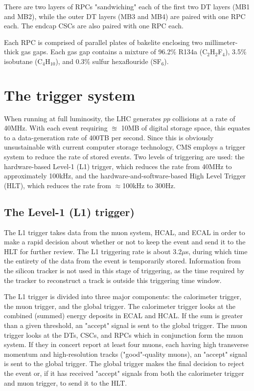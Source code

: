 There are two layers of RPCs "sandwiching" each of the first two DT layers (MB1 and MB2), while the outer DT layers (MB3 and MB4) are paired with one RPC each. The endcap CSCs are also paired with one RPC each. 

Each RPC is comprised of parallel plates of bakelite enclosing two millimeter-thick gas gaps. Each gas gap contains a mixture of 96.2\% R134a (C$_2$H$_2$F$_4$), 3.5\% isobutane (C$_4$H$_10$), and 0.3\% sulfur hexaflouride (SF$_6$).

\section{The trigger system}

When running at full luminosity, the LHC generates $pp$ collisions at a rate of 40MHz. With each event requiring $\approxeq$ 10MB of digital storage space, this equates to a data-generation rate of 400TB per second. Since this is obviously unsustainable with current computer storage technology, CMS employs a trigger system to reduce the rate of stored events. Two levels of triggering are used: the hardware-based Level-1 (L1) trigger, which reduces the rate from 40MHz to approximately 100kHz, and the hardware-and-software-based High Level Trigger (HLT), which reduces the rate from $\approx$100kHz to 300Hz.

\subsection{The Level-1 (L1) trigger)}

The L1 trigger takes data from the muon system, HCAL, and ECAL in order to make a rapid decision about whether or not to keep the event and send it to the HLT for further review. The L1 triggering rate is about 3.2$\mu$s, during which time the entirety of the data from the event is temporarily stored. Information from the silicon tracker is not used in this stage of triggering, as the time required by the tracker to reconstruct a track is outside this triggering time window. 

The L1 trigger is divided into three major components: the calorimeter trigger, the muon trigger, and the global trigger. The calorimeter trigger looks at the combined (summed) energy deposits in ECAL and HCAL. If the sum is greater than a given threshold, an "accept" signal is sent to the global trigger. The muon trigger looks at the DTs, CSCs, and RPCs which in conjunction form the muon system. If they in concert report at least four muons, each having high transverse momentum and high-resolution tracks ("good"-quality muons), an "accept" signal is sent to the global trigger. The global trigger makes the final decision to reject the event or, if it has received "accept" signals from both the calorimeter trigger and muon trigger, to send it to the HLT.

